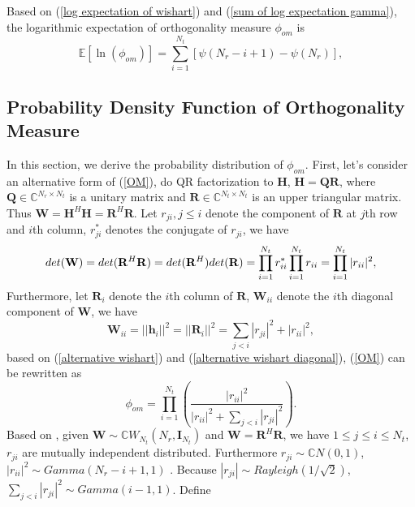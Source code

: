 \documentclass[12pt, draftclsnofoot, onecolumn]{IEEEtran}
\begin{document}
Based on (\ref{log expectation of wishart}) and (\ref{sum of log expectation gamma}), the logarithmic expectation of orthogonality measure $\phi_{om}$ is 
\begin{equation}
\mathbb{E}[\ln(\phi_{om})]=\sum_{i=1}^{N_{t}}[\psi(N_{r}-i+1)-\psi(N_{r})],
\label{final log expectation OM}
\end{equation}
\subsection{Probability Density Function of Orthogonality Measure}
In this section, we derive the probability distribution of $\phi_{om}$. First, let's consider an alternative form of (\ref{OM}), do QR factorization to $\mathbf{H}$, $\mathbf{H}=\mathbf{Q}\mathbf{R}$\cite{watkins2004fundamentals}, where $\mathbf{Q}\in\mathbb{C}^{N_{r}\times N_{t}}$ is a unitary matrix and $\mathbf{R}\in\mathbb{C}^{N_{t}\times N_{t}}$ is an upper triangular matrix. Thus $\mathbf{W}=\mathbf{H}^{H}\mathbf{H}=\mathbf{R}^{H}\mathbf{R}$. Let $r_{ji}, j\leq i$ denote the component of $\mathbf{R}$ at $j$th row and $i$th column, $r^{*}_{ji}$ denotes the conjugate of $r_{ji}$, we have
\begin{equation}
det(\mathbf{W})=det(\mathbf{R}^{H}\mathbf{R})=det(\mathbf{R}^{H})det(\mathbf{R})\\=\prod_{i=1}^{N_{t}}r_{ii}^{*}\prod_{i=1}^{N_{t}}r_{ii}=\prod_{i=1}^{N_{t}}|r_{ii}|^{2},
\label{alternative wishart}
\end{equation}
Furthermore, let $\mathbf{R}_{i}$ denote the $i$th column of $\mathbf{R}$, $\mathbf{W}_{ii}$ denote the $i$th diagonal component of $\mathbf{W}$, we have
\begin{equation}
\mathbf{W}_{ii}=||\mathbf{h}_{i}||^{2}=||\mathbf{R}_{i}||^{2}=\sum_{j<i}|r_{ji}|^{2}+|r_{ii}|^{2},
\label{alternative wishart diagonal}
\end{equation}
based on (\ref{alternative wishart}) and (\ref{alternative wishart diagonal}), (\ref{OM}) can be rewritten as 
\begin{equation}
\phi_{om}=\prod_{i=1}^{N_{t}}(\frac{|r_{ii}|^{2}}{|r_{ii}|^{2}+\sum_{j<i}|r_{ji}|^{2}}).
\label{alternative OM}
\end{equation}
Based on \cite{nagar2011expectations}, given $\mathbf{W}\sim \mathbb{C}W_{N_{t}}(N_{r}, \mathbf{I}_{N_{t}})$ and $\mathbf{W}=\mathbf{R}^{H}\mathbf{R}$, we have $1\leq j\leq i\leq N_{t}$, $r_{ji}$ are mutually independent distributed. Furthermore $r_{ji}\sim \mathbb{C}N(0,1)$, $|r_{ii}|^{2}\sim Gamma(N_{r}-i+1,1)$ . Because $|r_{ji}|\sim Rayleigh(1/\sqrt{2})$, $\sum_{j<i}|r_{ji}|^{2}\sim Gamma(i-1, 1)$. Define 
\end{document}
